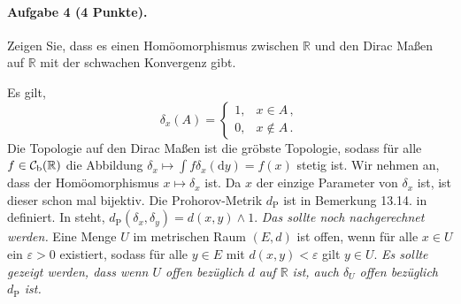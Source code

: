 \documentclass{article}
\begin{document}
\paragraph{Aufgabe 4 \textnormal{(4 Punkte)}.}
Zeigen Sie, dass es einen Homöomorphismus zwischen $\mathbb{R}$ und den Dirac Maßen auf $\mathbb{R}$ mit der schwachen Konvergenz gibt.

Es gilt,
\[
\delta_x(A)=
\begin{cases}
  1,&x\in A\,,\\
  0,&x\notin A\,.
\end{cases}
\]
Die Topologie auf den Dirac Maßen ist die gröbste Topologie, sodass für alle $f\in{\cal C}_\mathrm{b}(\mathbb{R})$ die Abbildung $\delta_x\mapsto\int f\delta_x(\mathrm{d}y)=f(x)$ stetig ist.
Wir nehmen an, dass der Homöomorphismus $x\mapsto\delta_x$ ist.
Da $x$ der einzige Parameter von $\delta_x$ ist, ist dieser schon mal bijektiv.
Die Prohorov-Metrik $d_\mathrm{P}$ ist in Bemerkung 13.14. in \cite{klenke} definiert.
In \cite{4438264} steht, $d_\mathrm{P}(\delta_x,\delta_y)=d(x,y)\wedge1$.
\emph{Das sollte noch nachgerechnet werden.}
Eine Menge $U$ im metrischen Raum $(E,d)$ ist offen, wenn für alle $x\in U$ ein $\varepsilon>0$ existiert, sodass für alle $y\in E$ mit $d(x,y)<\varepsilon$ gilt $y\in U$.
\emph{Es sollte gezeigt werden, dass wenn $U$ offen bezüglich $d$ auf $\mathbb{R}$ ist, auch $\delta_U$ offen bezüglich $d_\mathrm{P}$ ist.}

\end{document}
